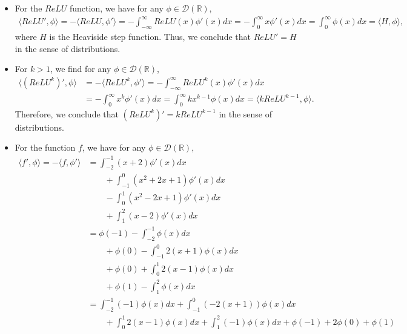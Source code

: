 \documentclass[11pt]{article}
\begin{document}
\begin{solution}
    \begin{itemize}
        \item For the $ReLU$ function, we have for any $\phi \in \mathcal D(\mathbb{R})$,
        \begin{align*}
            \langle ReLU', \phi \rangle = -\langle ReLU, \phi' \rangle = -\int_{-\infty}^{\infty} ReLU(x) \phi'(x) dx = -\int_{0}^{\infty} x \phi'(x) dx = \int_{0}^{\infty} \phi(x) dx = \langle H, \phi \rangle,
        \end{align*}
        where $H$ is the Heaviside step function. Thus, we conclude that $ReLU' = H$ in the sense of distributions.
        \item For $k > 1$, we find for any $\phi \in \mathcal D(\mathbb{R})$,
        \begin{align*}
            \langle (ReLU^k)', \phi \rangle &= - \langle ReLU^k, \phi' \rangle = - \int_{-\infty}^{\infty} ReLU^k(x) \phi'(x) dx \\
            &= - \int_{0}^{\infty} x^k \phi'(x) dx = \int_{0}^{\infty} k x^{k-1} \phi(x) dx = \langle k ReLU^{k-1}, \phi \rangle.
        \end{align*}
        Therefore, we conclude that $(ReLU^k)' = k ReLU^{k-1}$ in the sense of distributions.
        \item For the function $f$, we have for any $\phi \in \mathcal D(\mathbb{R})$,
        \begin{align*}
            \langle f', \phi \rangle 
			= 
			- \langle f, \phi'\rangle 
			&
			= 
			\int_{-2}^{-1}(x + 2) \phi'(x) dx 
			\\&\qquad 
			+ \int_{-1}^{0} (x^2 + 2x + 1) \phi'(x) dx
			\\&\qquad 
			- \int_{0}^{1} (x^2 - 2x + 1) \phi'(x) dx 
			\\&\qquad 
			+ \int_{1}^{2} (x - 2) \phi'(x) dx 
			\\
            &
			= \phi(-1) - \int_{-2}^{-1} \phi(x) dx 
			\\&\qquad 
			+ \phi(0) - \int_{-1}^{0} 2(x + 1) \phi(x)dx
			\\&\qquad 
			+ \phi(0) + \int_{0}^{1} 2(x - 1) \phi(x) dx 
			\\&\qquad 
			+ \phi(1) - \int_{1}^{2} \phi(x) dx 
			\\
            &
			= \int_{-2}^{-1} (-1) \phi(x) dx + \int_{-1}^0 (-2(x + 1)) \phi(x) dx 
			\\
            &\qquad 
			+ \int_{0}^{1} 2(x - 1) \phi(x) dx + \int_{1}^{2} (-1) \phi(x) dx + \phi(-1) + 2\phi(0) + \phi(1)

\end{align*}
\end{itemize}
\end{solution}
\end{document}
